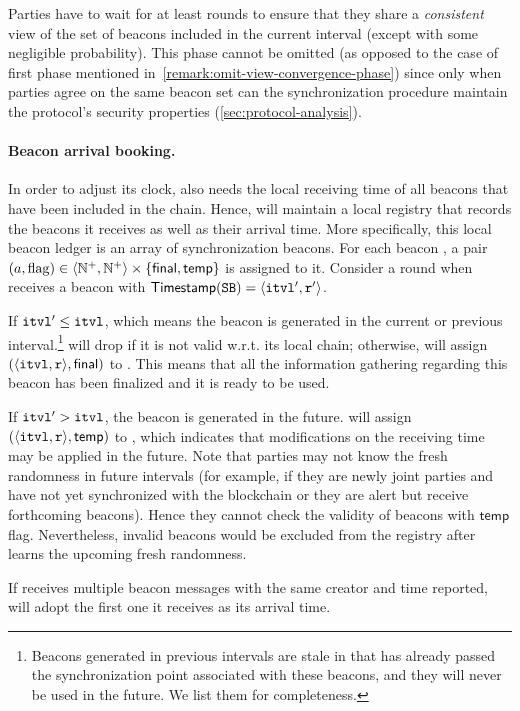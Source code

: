 Parties have to wait for at least \CPLen rounds to ensure that they share a \emph{consistent} view of the set of beacons included in the current interval (except with some negligible probability).
%
This phase cannot be omitted (as opposed to the case of first phase mentioned in~\cref{remark:omit-view-convergence-phase}) since only when parties agree on the same beacon set can the synchronization procedure maintain the protocol's security properties (\cref{sec:protocol-analysis}).

\paragraph{Beacon arrival booking.}
%
In order to adjust its clock, \party also needs the local receiving time of all beacons that have been included in the chain.
%
Hence, \party will maintain a local registry that records the beacons it receives as well as their arrival time.
%
More specifically, this local beacon ledger is an array of synchronization beacons.
%
For each beacon \beacon, a pair $(a, \mathrm{flag}) \in \langle \mathbb{N}^+, \mathbb{N}^+ \rangle \times \{\mathsf{final}, \mathsf{temp} \}$ is assigned to it.
%
Consider a round \protocolTime{\interval}{\round} when \party receives a beacon \beacon with $\mathsf{Timestamp}(\mathtt{SB}) = \langle \mathtt{itvl}', \mathtt{r}' \rangle$.
%
\begin{cccItemize}[noitemsep]
    \item If $\mathtt{itvl}' \le \mathtt{itvl}$, which means the beacon \beacon is generated in the current or previous interval.\footnote{Beacons generated in previous intervals are stale in that \party has already passed the synchronization point associated with these beacons, and they will never be used in the future. We list them for completeness.}
    \party will drop \beacon if it is not valid w.r.t. its local chain; otherwise, \party will assign $(\langle \mathtt{itvl}, \mathtt{r} \rangle, \mathsf{final})$ to \beacon.
    This means that all the information gathering regarding this beacon has been finalized and it is ready to be used.

    \item If $\mathtt{itvl}' > \mathtt{itvl}$, the beacon is generated in the future.
    \party will assign $(\langle \mathtt{itvl}, \mathtt{r} \rangle, \allowbreak \mathsf{temp})$ to \beacon, which indicates that modifications on the receiving time may be applied in the future.
    Note that parties may not know the fresh randomness in future intervals (for example, if they are newly joint parties and have not yet synchronized with the blockchain or they are alert but receive forthcoming beacons).
    Hence they cannot check the validity of beacons with $\mathsf{temp}$ flag.
    Nevertheless, invalid beacons would be excluded from the registry after \party learns the upcoming fresh randomness.
\end{cccItemize}
%
If \party receives multiple beacon messages with the same creator and time reported, \party will adopt the first one it receives as its arrival time.

